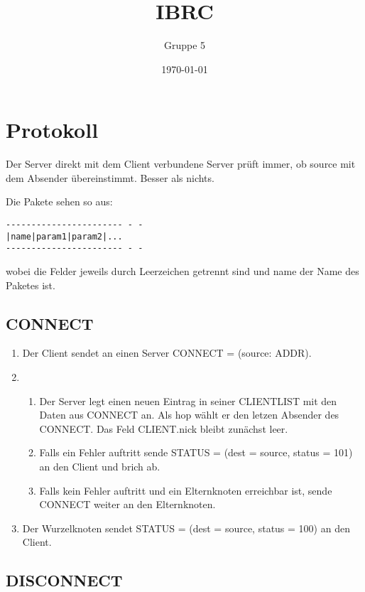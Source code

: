 \documentclass{article}
\title{IBRC}
\author{Gruppe 5}
\date{\today}
\begin{document}
\maketitle

\section{Protokoll}

Der Server direkt mit dem Client verbundene Server prüft immer, ob source mit dem Absender übereinstimmt. Besser als nichts. 

Die Pakete sehen so aus:
\begin{lstlisting}
----------------------- - -
|name|param1|param2|...
----------------------- - -
\end{lstlisting}
wobei die Felder jeweils durch Leerzeichen getrennt sind und name der Name des Paketes ist.

\subsection{CONNECT}

\begin{enumerate}
  \item Der Client sendet an einen Server CONNECT = (source: ADDR).
  \item
    \begin{enumerate}
      \item Der Server legt einen neuen Eintrag in seiner CLIENTLIST mit den Daten aus CONNECT an. 
        Als hop wählt er den letzen Absender des CONNECT. Das Feld CLIENT.nick bleibt zunächst leer.
      \item Falls ein Fehler auftritt sende STATUS = (dest = source, status = 101) an den Client und brich ab.
      \item Falls kein Fehler auftritt und ein Elternknoten erreichbar ist, sende CONNECT weiter an den Elternknoten.
    \end{enumerate}
  \item Der Wurzelknoten sendet STATUS = (dest = source, status = 100) an den Client.
\end{enumerate}

\subsection{DISCONNECT}
\end{document}
